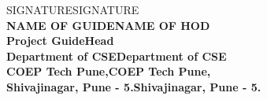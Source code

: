\begin{center}		%

SIGNATURESIGNATURE\\
\normalsize{\bf{NAME OF GUIDENAME OF HOD\\
Project GuideHead}\\
Department of CSEDepartment of CSE\\
COEP Tech Pune,COEP Tech Pune,\\
Shivajinagar, Pune - 5.Shivajinagar, Pune - 5.}
\end{center}

